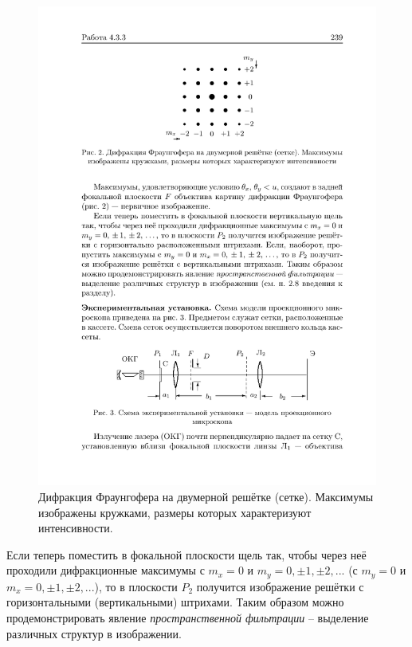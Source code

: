 \documentclass[a4paper, 12pt]{article}%
\begin{document}
	\begin{figure}[h]
\includegraphics[scale=1.5]{max.pdf}
\centering
\caption{Дифракция Фраунгофера на двумерной решётке (сетке). Максимумы изображены кружками, размеры которых характеризуют интенсивности.}
\end{figure}
	
	Если теперь поместить в фокальной плоскости щель так, чтобы через неё проходили дифракционные максимумы с $m_x = 0$ и $m_y =0, \pm 1, \pm 2, ...$ (с $m_y = 0$ и $m_x =0, \pm 1, \pm 2, ...$), то в плоскости $P_2$ получится изображение решётки с горизонтальными (вертикальными) штрихами. Таким образом можно продемонстрировать явление \textit{пространственной фильтрации} -- выделение различных структур в изображении.
\end{document}
